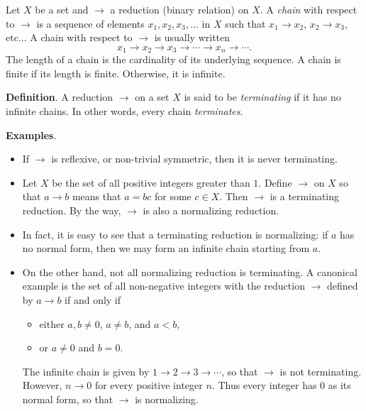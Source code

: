 \documentclass[12pt]{article}
\begin{document}
Let $X$ be a set and $\to$ a reduction (binary relation) on $X$.  A \emph{chain} with respect to $\to$ is a sequence of elements $x_1,x_2,x_3,\ldots$ in $X$ such that $x_1\to x_2$, $x_2\to x_3$, etc... A chain with respect to $\to$ is usually written $$x_1\to x_2 \to x_3 \to \cdots \to x_n \to \cdots.$$
The length of a chain is the cardinality of its underlying sequence.  A chain is finite if its length is finite.  Otherwise, it is infinite.  

\textbf{Definition}.  A reduction $\to$ on a set $X$ is said to be \emph{terminating} if it has no infinite chains.  In other words, every chain \emph{terminates}.

\textbf{Examples}.
\begin{itemize}
\item If $\to$ is reflexive, or non-trivial symmetric, then it is never terminating.
\item Let $X$ be the set of all positive integers greater than $1$.  Define $\to$ on $X$ so that $a\to b$ means that $a=bc$ for some $c\in X$.  Then $\to$ is a terminating reduction.  By the way, $\to$ is also a normalizing reduction.
\item In fact, it is easy to see that a terminating reduction is normalizing: if $a$ has no normal form, then we may form an infinite chain starting from $a$.
\item On the other hand, not all normalizing reduction is terminating.  A canonical example is the set of all non-negative integers with the reduction $\to$ defined by $a\to b$ if and only if
\begin{itemize}
\item either $a,b\ne 0$, $a\ne b$, and $a<b$,
\item or $a\ne 0$ and $b=0$. 
\end{itemize}
The infinite chain is given by $1\to 2\to 3\to \cdots $, so that $\to$ is not terminating.  However, $n\to 0$ for every positive integer $n$.  Thus every integer has $0$ as its normal form, so that $\to$ is normalizing.
\end{itemize}
\end{document}
